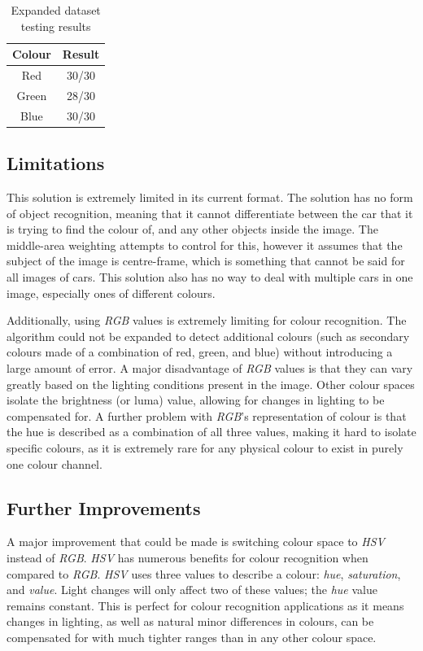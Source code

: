 \documentclass[conference]{IEEEtran}
\begin{document}
\begin{table}[H]
\caption{Expanded dataset testing results}
\label{testing_results1}
\centering
\begin{tabular}{|c||c|}
\hline
Colour & Result\\
\hline
Red & 30/30\\
\hline
Green & 28/30\\
\hline
Blue & 30/30\\
\hline
\end{tabular}
\end{table}



\subsection{Limitations}
This solution is extremely limited in its current format. The solution has no form of object recognition, meaning that it cannot differentiate between the car that it is trying to find the colour of, and any other objects inside the image. The middle-area weighting attempts to control for this, however it assumes that the subject of the image is centre-frame, which is something that cannot be said for all images of cars. This solution also has no way to deal with multiple cars in one image, especially ones of different colours. 

Additionally, using \textit{RGB} values is extremely limiting for colour recognition. The algorithm could not be expanded to detect additional colours (such as secondary colours made of a combination of red, green, and blue) without introducing a large amount of error. A major disadvantage of \textit{RGB} values is that they can vary greatly based on the lighting conditions present in the image. Other colour spaces isolate the brightness (or luma) value, allowing for changes in lighting to be compensated for. A further problem with \textit{RGB}'s representation of colour is that the hue is described as a combination of all three values, making it hard to isolate specific colours, as it is extremely rare for any physical colour to exist in purely one colour channel.


\subsection{Further Improvements} \label{sec:further1}
A major improvement that could be made is switching colour space to \textit{HSV} instead of \textit{RGB}. \textit{HSV} has numerous benefits for colour recognition when compared to \textit{RGB}. \textit{HSV} uses three values to describe a colour: \textit{hue}, \textit{saturation}, and \textit{value}. Light changes will only affect two of these values; the \textit{hue} value remains constant\cite{RBGvHSV}. This is perfect for colour recognition applications as it means changes in lighting, as well as natural minor differences in colours, can be compensated for with much tighter ranges than in any other colour space.
\end{document}
